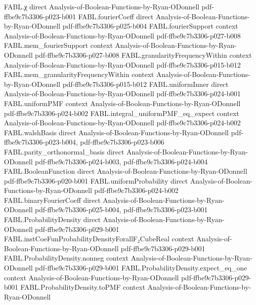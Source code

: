 \begin{theorem}
\proofstep
  {FABL.χ}
  {direct}
  {Analysis-of-Boolean-Functions-by-Ryan-ODonnell}
  {pdf-ffbe9c7b3306-p023-b001}
\proofstep
  {FABL.fourierCoeff}
  {direct}
  {Analysis-of-Boolean-Functions-by-Ryan-ODonnell}
  {pdf-ffbe9c7b3306-p025-b004}
\proofstep
  {FABL.fourierSupport}
  {context}
  {Analysis-of-Boolean-Functions-by-Ryan-ODonnell}
  {pdf-ffbe9c7b3306-p027-b008}
\proofstep
  {FABL.mem_fourierSupport}
  {context}
  {Analysis-of-Boolean-Functions-by-Ryan-ODonnell}
  {pdf-ffbe9c7b3306-p027-b008}
\proofstep
  {FABL.granularityFrequencyWithin}
  {context}
  {Analysis-of-Boolean-Functions-by-Ryan-ODonnell}
  {pdf-ffbe9c7b3306-p015-b012}
\proofstep
  {FABL.mem_granularityFrequencyWithin}
  {context}
  {Analysis-of-Boolean-Functions-by-Ryan-ODonnell}
  {pdf-ffbe9c7b3306-p015-b012}
\proofstep
  {FABL.uniformInner}
  {direct}
  {Analysis-of-Boolean-Functions-by-Ryan-ODonnell}
  {pdf-ffbe9c7b3306-p024-b001}
\proofstep
  {FABL.uniformPMF}
  {context}
  {Analysis-of-Boolean-Functions-by-Ryan-ODonnell}
  {pdf-ffbe9c7b3306-p024-b002}
\proofstep
  {FABL.integral_uniformPMF_eq_expect}
  {context}
  {Analysis-of-Boolean-Functions-by-Ryan-ODonnell}
  {pdf-ffbe9c7b3306-p024-b002}
\proofstep
  {FABL.walshBasis}
  {direct}
  {Analysis-of-Boolean-Functions-by-Ryan-ODonnell}
  {pdf-ffbe9c7b3306-p023-b004,
    pdf-ffbe9c7b3306-p023-b006}
\proofstep
  {FABL.parity_orthonormal_basis}
  {direct}
  {Analysis-of-Boolean-Functions-by-Ryan-ODonnell}
  {pdf-ffbe9c7b3306-p024-b003,
    pdf-ffbe9c7b3306-p024-b004}
\proofstep
  {FABL.BooleanFunction}
  {direct}
  {Analysis-of-Boolean-Functions-by-Ryan-ODonnell}
  {pdf-ffbe9c7b3306-p020-b001}
\proofstep
  {FABL.uniformProbability}
  {direct}
  {Analysis-of-Boolean-Functions-by-Ryan-ODonnell}
  {pdf-ffbe9c7b3306-p024-b002}
\proofstep
  {FABL.binaryFourierCoeff}
  {direct}
  {Analysis-of-Boolean-Functions-by-Ryan-ODonnell}
  {pdf-ffbe9c7b3306-p025-b004,
    pdf-ffbe9c7b3306-p023-b001}
\proofstep
  {FABL.ProbabilityDensity}
  {direct}
  {Analysis-of-Boolean-Functions-by-Ryan-ODonnell}
  {pdf-ffbe9c7b3306-p029-b001}
\proofstep
  {FABL.instCoeFunProbabilityDensityForallF₂CubeReal}
  {context}
  {Analysis-of-Boolean-Functions-by-Ryan-ODonnell}
  {pdf-ffbe9c7b3306-p029-b001}
\proofstep
  {FABL.ProbabilityDensity.nonneg}
  {context}
  {Analysis-of-Boolean-Functions-by-Ryan-ODonnell}
  {pdf-ffbe9c7b3306-p029-b001}
\proofstep
  {FABL.ProbabilityDensity.expect_eq_one}
  {context}
  {Analysis-of-Boolean-Functions-by-Ryan-ODonnell}
  {pdf-ffbe9c7b3306-p029-b001}
\proofstep
  {FABL.ProbabilityDensity.toPMF}
  {context}
  {Analysis-of-Boolean-Functions-by-Ryan-ODonnell}

\end{theorem}
